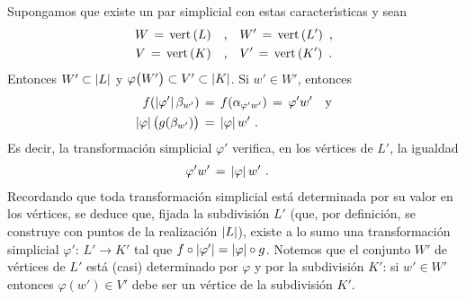 \begin{obsSubdividirUnParSimplicial}
	Supongamos que existe un par simplicial con estas caracter\'{\i}sticas
	y sean
	\begin{align*}
		W\,=\,\mathrm{vert}\left(L\right) & \quad\text{,}\quad W'\,=\,\mathrm{vert}\left(L'\right)
			\text{ ,} \\
		V\,=\,\mathrm{vert}\left(K\right) & \quad\text{,}\quad V'\,=\,\mathrm{vert}\left(K'\right)
		\text{ .}
	\end{align*}
	Entonces $W'\subset\left|L\right|$ y
	$\varphi\big(W'\big)\subset V'\subset\left|K\right|$. Si $w'\in W'$,
	entonces
	\begin{align*}
		f(\left|\varphi'\right|\beta_{w'}) & \,=\,f(\alpha_{\varphi'w'})
			\,=\,\varphi'w'\quad\text{y} \\
		\left|\varphi\right|\big(g(\beta_{w'})\big) & \,=\,
			\left|\varphi\right|w'
		\text{ .}
	\end{align*}
	Es decir, la transformaci\'{o}n simplicial $\varphi'$ verifica,
	en los v\'{e}rtices de $L'$, la igualdad
	\begin{align*}
		\varphi'w' & \,=\,\left|\varphi\right|w'
		\text{ .}
	\end{align*}
	Recordando que toda transformaci\'{o}n simplicial est\'{a} determinada
	por su valor en los v\'{e}rtices, se deduce que, fijada la
	subdivisi\'{o}n $L'$ (que, por definici\'{o}n, se construye con puntos
	de la realizaci\'{o}n $\left|L\right|$), existe a lo sumo una
	transformaci\'{o}n simplicial $\varphi':\,L'\rightarrow K'$ tal que
	$f\circ\left|\varphi'\right|=\left|\varphi\right|\circ g$. Notemos que el conjunto
	$W'$ de v\'{e}rtices de $L'$ est\'{a} (casi) determinado por $\varphi$
	y por la subdivisi\'{o}n $K'$: si $w'\in W'$ entonces
	$\varphi(w')\in V'$ debe ser un v\'{e}rtice de la subdivisi\'{o}n $K'$.


\end{obsSubdividirUnParSimplicial}
